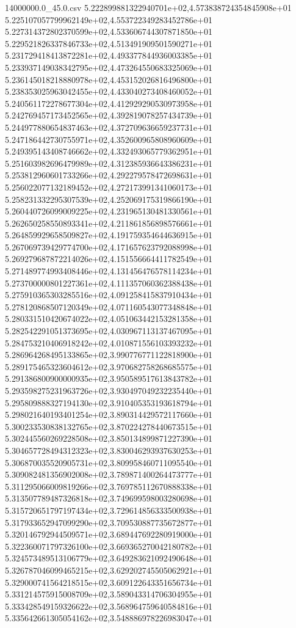 \begin{filecontents*}{14000000.0_45.0.csv}
5.222899881322940701e+02,4.573838724354845908e+01
5.225107057799962149e+02,4.553722349283452786e+01
5.227314372802370599e+02,4.533606744307871850e+01
5.229521826337846733e+02,4.513491909501590271e+01
5.231729418413872281e+02,4.493377844936003385e+01
5.233937149038342795e+02,4.473264550683325069e+01
5.236145018218880978e+02,4.453152026816496800e+01
5.238353025963042455e+02,4.433040273408460052e+01
5.240561172278677304e+02,4.412929290530973958e+01
5.242769457173452565e+02,4.392819078257434739e+01
5.244977880654837463e+02,4.372709636659237731e+01
5.247186442730755971e+02,4.352600965808960609e+01
5.249395143408746662e+02,4.332493065779362951e+01
5.251603982696479989e+02,4.312385936643386231e+01
5.253812960601733266e+02,4.292279578472698631e+01
5.256022077132189452e+02,4.272173991341060173e+01
5.258231332295307539e+02,4.252069175319866190e+01
5.260440726099009225e+02,4.231965130481330561e+01
5.262650258550893341e+02,4.211861856898576661e+01
5.264859929658509827e+02,4.191759354644636915e+01
5.267069739429774700e+02,4.171657623792088998e+01
5.269279687872214026e+02,4.151556664411782549e+01
5.271489774993408446e+02,4.131456476578114234e+01
5.273700000801227361e+02,4.111357060362388438e+01
5.275910365303285516e+02,4.091258415837910434e+01
5.278120868507120349e+02,4.071160543077348848e+01
5.280331510420674022e+02,4.051063442153281358e+01
5.282542291051373695e+02,4.030967113137467095e+01
5.284753210406918242e+02,4.010871556103393232e+01
5.286964268495133865e+02,3.990776771122818900e+01
5.289175465323604612e+02,3.970682758268685575e+01
5.291386800900000935e+02,3.950589517613843782e+01
5.293598275231963726e+02,3.930497049232235440e+01
5.295809888327194130e+02,3.910405353193618794e+01
5.298021640193401254e+02,3.890314429572117660e+01
5.300233530838132765e+02,3.870224278440673515e+01
5.302445560269228508e+02,3.850134899871227390e+01
5.304657728494312323e+02,3.830046293937630253e+01
5.306870035520905731e+02,3.809958460711095540e+01
5.309082481356902008e+02,3.789871400264473777e+01
5.311295066009819266e+02,3.769785112670888338e+01
5.313507789487326818e+02,3.749699598003280698e+01
5.315720651797197434e+02,3.729614856333500938e+01
5.317933652947099290e+02,3.709530887735672877e+01
5.320146792944509571e+02,3.689447692280919000e+01
5.322360071797326100e+02,3.669365270042180782e+01
5.324573489513106779e+02,3.649283621092490648e+01
5.326787046099465215e+02,3.629202745505062921e+01
5.329000741564218515e+02,3.609122643351656734e+01
5.331214575915008709e+02,3.589043314706304955e+01
5.333428549159326622e+02,3.568964759640584816e+01
5.335642661305054162e+02,3.548886978226983047e+01

\end{filecontents*}
